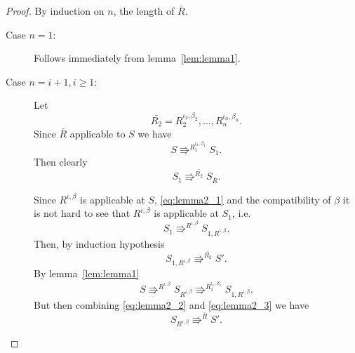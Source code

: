 \begin{proof}
  By induction on $n$, the length of $\bar{R}$.
  \begin{description}
    \item[Case $n = 1$:] Follows immediately from lemma~\ref{lem:lemma1}.
    \item[Case $n = i+1, i \geq 1$:] Let
      \begin{equation*}
        \bar{R_2} = R_2^{\iota_2, \beta_2}, \dots, R_n^{\iota_n, \beta_n}.
      \end{equation*}
      Since $\bar{R}$ applicable to $S$ we have 
      \begin{equation}
        S \Rrightarrow^{R_1^{\iota_1, \beta_1}} S_1.
      \end{equation}
      Then clearly
      \begin{equation}
        S_1 \Rrightarrow^{\bar{R_2}} S_{\bar{R}}.
      \end{equation}
      
      Since $R^{\iota, \beta}$ is applicable at $S$, \eqref{eq:lemma2_1} and
      the compatibility of $\beta$ it is not hard to see that
      $R^{\iota, \beta}$ is applicable at $S_1$, i.e.
      \begin{equation}
        S_1 \Rrightarrow^{R^{\iota, \beta}} S_{1,R^{\iota, \beta}}.
      \end{equation}
      Then, by induction hypothesis
      \begin{equation} \label{eq:lemma2_2}
        S_{1,R^{\iota, \beta}} \Rrightarrow^{\bar{R_2}} S'.
      \end{equation}
      By lemma~\ref{lem:lemma1} 
      \begin{equation} \label{eq:lemma2_3}
        S \Rrightarrow^{R^{\iota, \beta}} S_{R^{\iota, \beta}}
        \Rrightarrow^{R_1^{\iota_1, \beta_1}} S_{1, R^{\iota, \beta}}.
      \end{equation}
      But then combining \eqref{eq:lemma2_2} and \eqref{eq:lemma2_3} we have
      \begin{equation}
        S_{R^{\iota, \beta}} \Rrightarrow^{\bar{R}} S'.
      \end{equation}
  \end{description}
\end{proof}


